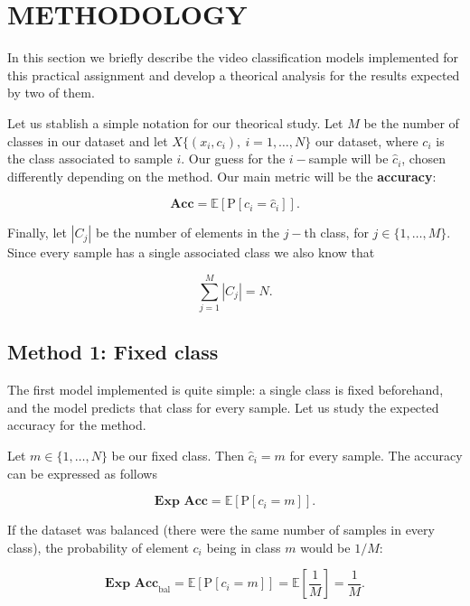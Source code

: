\documentclass[letterpaper, 10 pt, conference]{ieeeconf}
\newcommand{\E}{\mathbb E}
\newcommand{\PP}{\text{P}}
\begin{document}
\section{METHODOLOGY}
\label{section:method}

In this section we briefly describe the video classification models implemented for this practical assignment and develop a theorical analysis for the results expected by two of them.

Let us stablish a simple notation for our theorical study. Let $M$ be the number of classes in our dataset and let $X \{(x_i, c_i), \ i = 1,\dots, N \}$ our dataset, where $c_i$ is the class associated to sample $i$. Our guess for the $i-$sample will be $\hat c_i$, chosen differently depending on the method. Our main metric will be the \textbf{accuracy}:

\[
    \textbf{Acc} = \E \left[ \PP \left [ c_i = \hat c_i \right ] \right ].
\]

Finally, let $|C_j|$ be the number of elements in the $j-$th class, for $j \in \{1, \ldots, M\}$. Since every sample has a single associated class we also know that

\begin{equation}
    \label{eq:classes}
    \sum_{j=1}^M |C_j| = N.
\end{equation}

\subsection{Method 1: Fixed class}

The first model implemented is quite simple: a single class is fixed beforehand, and the model predicts that class for every sample. Let us study the expected accuracy for the method.

Let $m \in \{1, \ldots, N\}$ be our fixed class. Then $\hat c_i = m$ for every sample. The accuracy can be expressed as follows

\[
    \textbf{Exp Acc} = \E \left[ \PP \left [ c_i = m \right ] \right ].
\]

If the dataset was balanced (there were the same number of samples in every class), the probability of element $c_i$ being in class $m$ would be $1/M$:

\[
    \textbf{Exp Acc}_\text{bal} = \E \left[ \PP \left [ c_i = m \right ] \right ]  = \E \left[ \frac{1}{M} \right ] = \frac{1}{M}.
\]
\end{document}
